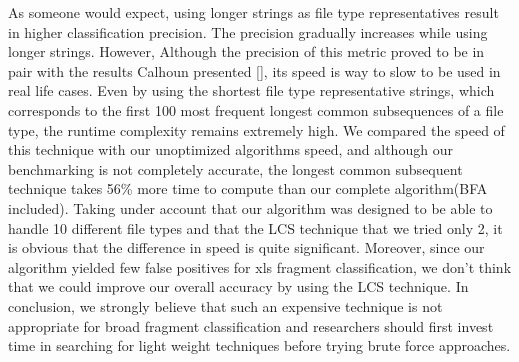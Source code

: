 
As someone would expect, using longer strings as file type representatives result in higher classification precision. The precision gradually increases while using longer strings. However, Although the precision of this metric proved to be in pair with the results Calhoun presented [], its speed is way to slow to be used in real life cases. Even by using the shortest file type representative strings, which corresponds to the first 100 most frequent longest common subsequences of a file type, the runtime complexity remains extremely high. We compared the speed of this technique with our unoptimized algorithms speed, and although our benchmarking is not completely accurate, the longest common subsequent technique takes 56\% more time to compute than our complete algorithm(BFA included). Taking under account that our algorithm was designed to be able to handle 10 different file types and that the LCS technique that we tried only 2, it is obvious that the difference in speed is quite significant. Moreover, since our algorithm yielded few false positives for xls fragment classification, we don't think that we could improve our overall accuracy by using the LCS technique. In conclusion, we strongly believe that such an expensive technique is not appropriate for broad fragment classification and researchers should first invest time in searching for light weight techniques before trying brute force approaches. 
 